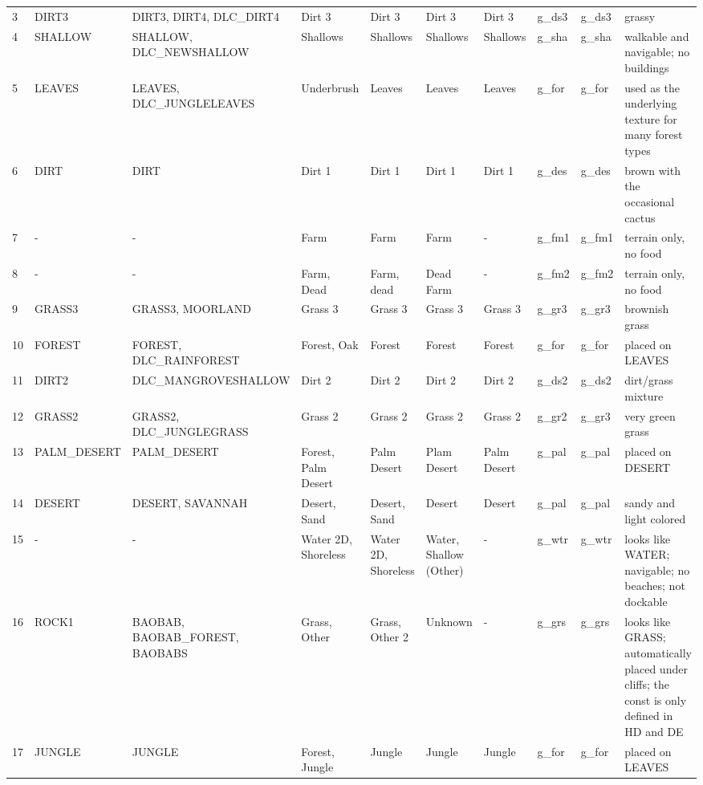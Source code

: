 \begin{appendices}
\begin{landscape}
\begin{longtable}{@{}p{5mm}|p{25mm}p{23mm}|p{14mm}p{14mm}p{14mm}p{14mm}|p{10mm}p{15mm}|p{45mm}@{}}
            3	& DIRT3	& DIRT3, DIRT4, DLC\_DIRT4	& Dirt 3	& Dirt 3	& Dirt 3	& Dirt 3	& g\_ds3	& g\_ds3		& grassy \\
            4	& SHALLOW	& SHALLOW, DLC\_NEWSHALLOW	& Shallows	& Shallows	& Shallows	& Shallows	& g\_sha	& g\_sha		& walkable and navigable; no buildings \\
            5	& LEAVES	& LEAVES, DLC\_JUNGLELEAVES	& Underbrush	& Leaves	& Leaves	& Leaves	& g\_for	& g\_for		& used as the underlying texture for many forest types \\
            6	& DIRT	& DIRT	& Dirt 1	& Dirt 1	& Dirt 1	& Dirt 1	& g\_des	& g\_des		& brown with the occasional cactus \\
            7	& -	& -	& Farm	& Farm	& Farm	& -	& g\_fm1	& g\_fm1		& terrain only, no food \\
            8	& -	& -	& Farm, Dead	& Farm, dead	& Dead Farm	& -	& g\_fm2	& g\_fm2		& terrain only, no food \\
            9	& GRASS3	& GRASS3, MOORLAND	& Grass 3	& Grass 3	& Grass 3	& Grass 3	& g\_gr3	& g\_gr3		& brownish grass \\
            10	& FOREST	& FOREST, DLC\_RAINFOREST	& Forest, Oak	& Forest	& Forest	& Forest	& g\_for	& g\_for		& placed on LEAVES \\
            11	& DIRT2	& DLC\_MANGROVESHALLOW	& Dirt 2	& Dirt 2	& Dirt 2	& Dirt 2	& g\_ds2	& g\_ds2		& dirt/grass mixture \\
            12	& GRASS2	& GRASS2, DLC\_JUNGLEGRASS	& Grass 2	& Grass 2	& Grass 2	& Grass 2	& g\_gr2	& g\_gr3		& very green grass \\
            13	& PALM\_DESERT	& PALM\_DESERT	& Forest, Palm Desert	& Palm Desert	& Plam Desert	& Palm Desert	& g\_pal	& g\_pal		& placed on DESERT \\
            14	& DESERT	& DESERT, SAVANNAH	& Desert, Sand	& Desert, Sand	& Desert	& Desert	& g\_pal	& g\_pal		& sandy and light colored \\
            15	& -	& -	& Water 2D, Shoreless	& Water 2D, Shoreless	& Water, Shallow (Other)	& -	& g\_wtr	& g\_wtr		& looks like WATER; navigable; no beaches; not dockable \\
            16	& ROCK1	& BAOBAB, BAOBAB\_FOREST, BAOBABS	& Grass, Other	& Grass, Other 2	& Unknown	& -	& g\_grs	& g\_grs		& looks like GRASS; automatically placed under cliffs; the const is only defined in HD and DE \\
            17	& JUNGLE	& JUNGLE	& Forest, Jungle	& Jungle	& Jungle	& Jungle	& g\_for	& g\_for		& placed on LEAVES \\

\end{longtable}
\end{landscape}
\end{appendices}

